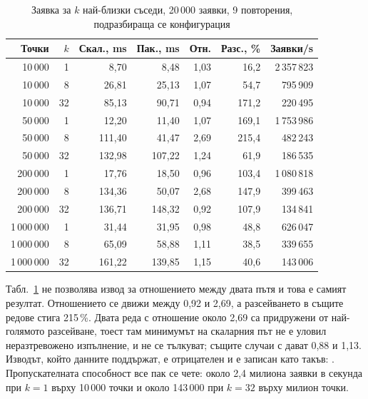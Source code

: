 \begin{table}[H]
\centering
\caption{Заявка за $k$ най-близки съседи, 20\,000 заявки, 9 повторения, подразбираща се конфигурация}
\label{tab:knn}
\begin{tabular}{@{}rrrrrrr@{}}
\toprule
\textbf{Точки} & \textbf{$k$} & \textbf{Скал., ms} & \textbf{Пак., ms} & \textbf{Отн.} & \textbf{Разс., \%} & \textbf{Заявки/s} \\
\midrule
10\,000 &  1 &   8{,}70 &   8{,}48 & 1{,}03 &  16{,}2 & 2\,357\,823 \\
10\,000 &  8 &  26{,}81 &  25{,}13 & 1{,}07 &  54{,}7 &    795\,909 \\
10\,000 & 32 &  85{,}13 &  90{,}71 & 0{,}94 & 171{,}2 &    220\,495 \\
50\,000 &  1 &  12{,}20 &  11{,}40 & 1{,}07 & 169{,}1 & 1\,753\,986 \\
50\,000 &  8 & 111{,}40 &  41{,}47 & 2{,}69 & 215{,}4 &    482\,243 \\
50\,000 & 32 & 132{,}98 & 107{,}22 & 1{,}24 &  61{,}9 &    186\,535 \\
200\,000 &  1 &  17{,}76 &  18{,}50 & 0{,}96 & 103{,}4 & 1\,080\,818 \\
200\,000 &  8 & 134{,}36 &  50{,}07 & 2{,}68 & 147{,}9 &    399\,463 \\
200\,000 & 32 & 136{,}71 & 148{,}32 & 0{,}92 & 107{,}9 &    134\,841 \\
1\,000\,000 &  1 &  31{,}44 &  31{,}95 & 0{,}98 &  48{,}8 &    626\,047 \\
1\,000\,000 &  8 &  65{,}09 &  58{,}88 & 1{,}11 &  38{,}5 &    339\,655 \\
1\,000\,000 & 32 & 161{,}22 & 139{,}85 & 1{,}15 &  40{,}6 &    143\,006 \\
\bottomrule
\end{tabular}
\end{table}

Табл.~\ref{tab:knn} не позволява извод за отношението между двата пътя и това е самият резултат.
Отношението се движи между 0,92 и 2,69, а разсейването в същите редове стига 215\,\%. Двата реда
с отношение около 2,69 са придружени от най-голямото разсейване, тоест там минимумът на
скаларния път не е уловил неразтревожено изпълнение, и не се тълкуват; същите случаи с
 дават 0,88 и 1,13. Изводът, който данните поддържат, е отрицателен и е
записан като такъв: . Пропускателната способност все пак се чете: около 2,4 милиона
заявки в секунда при $k = 1$ върху 10\,000 точки и около 143\,000 при $k = 32$ върху милион
точки.


